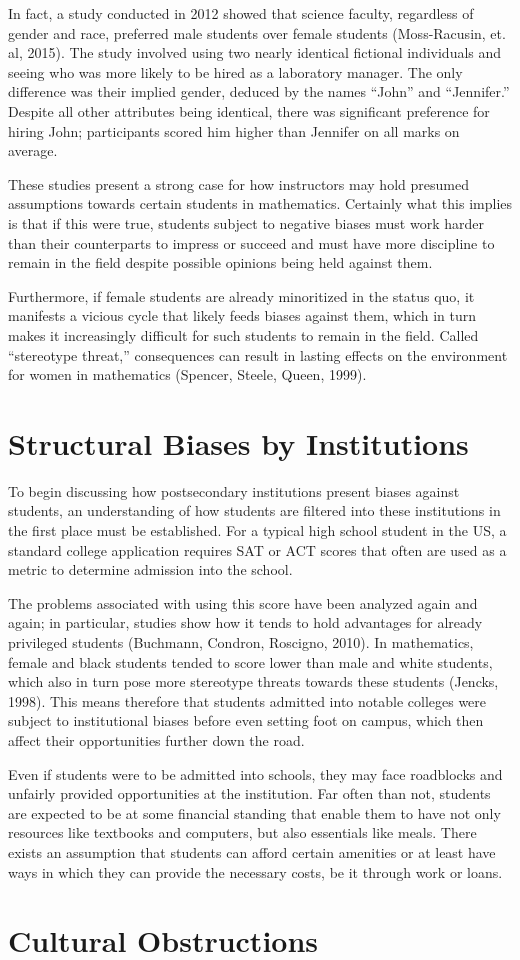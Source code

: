 In fact, a study conducted in 2012 showed that science faculty, regardless of gender and race, preferred male students over female students (Moss-Racusin, et. al, 2015). The study involved using two nearly identical fictional individuals and seeing who was more likely to be hired as a laboratory manager. The only difference was their implied gender, deduced by the names ``John'' and ``Jennifer.'' Despite all other attributes being identical, there was significant preference for hiring John; participants scored him higher than Jennifer on all marks on average.

These studies present a strong case for how instructors may hold presumed assumptions towards certain students in mathematics. Certainly what this implies is that if this were true, students subject to negative biases must work harder than their counterparts to impress or succeed and must have more discipline to remain in the field despite possible opinions being held against them.

Furthermore, if female students are already minoritized in the status quo, it manifests a vicious cycle that likely feeds biases against them, which in turn makes it increasingly difficult for such students to remain in the field. Called ``stereotype threat,'' consequences can result in lasting effects on the environment for women in mathematics (Spencer, Steele, Queen, 1999).

\section{Structural Biases by Institutions}
To begin discussing how postsecondary institutions present biases against students, an understanding of how students are filtered into these institutions in the first place must be established. For a typical high school student in the US, a standard college application requires SAT or ACT scores that often are used as a metric to determine admission into the school.

The problems associated with using this score have been analyzed again and again; in particular, studies show how it tends to hold advantages for already privileged students (Buchmann, Condron, Roscigno, 2010). In mathematics, female and black students tended to score lower than male and white students, which also in turn pose more stereotype threats towards these students (Jencks, 1998). This means therefore that students admitted into notable colleges were subject to institutional biases before even setting foot on campus, which then affect their opportunities further down the road.

Even if students were to be admitted into schools, they may face roadblocks and unfairly provided opportunities at the institution. Far often than not, students are expected to be at some financial standing that enable them to have not only resources like textbooks and computers, but also essentials like meals. There exists an assumption that students can afford certain amenities or at least have ways in which they can provide the necessary costs, be it through work or loans.
\section{Cultural Obstructions}
